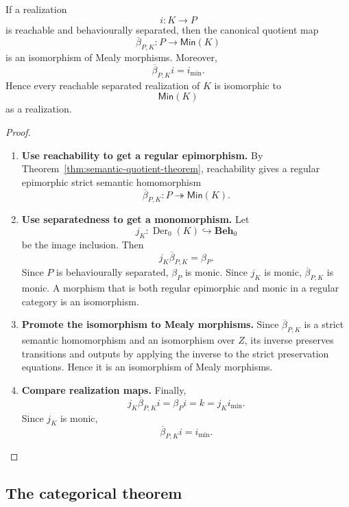 \begin{theorem}
\label{thm:minimal-realization}
    If a realization
    \[
        i:K\to P
    \]
    is reachable and behaviourally separated, then the canonical quotient map
    \[
        \overline{\beta}_{P,K}:P\to\mathsf{Min}(K)
    \]
    is an isomorphism of Mealy morphisms. Moreover,
    \[
        \overline{\beta}_{P,K}i=i_{\min}.
    \]
    Hence every reachable separated realization of \(K\) is isomorphic to
    \[
        \mathsf{Min}(K)
    \]
    as a realization.
\end{theorem}
\begin{proof}
    \leavevmode
    \begin{enumerate}
        \item \textbf{Use reachability to get a regular epimorphism.} By Theorem~\ref{thm:semantic-quotient-theorem}, reachability gives a regular epimorphic strict semantic homomorphism
        \[
            \overline{\beta}_{P,K}:P\twoheadrightarrow\mathsf{Min}(K).
        \]

        \item \textbf{Use separatedness to get a monomorphism.} Let
        \[
            j_K:\operatorname{Der}_0(K)\hookrightarrow\mathbf{Beh}_0
        \]
        be the image inclusion. Then
        \[
            j_K\overline{\beta}_{P,K}=\beta_P.
        \]
        Since \(P\) is behaviourally separated, \(\beta_P\) is monic. Since \(j_K\) is monic, \(\overline{\beta}_{P,K}\) is monic. A morphism that is both regular epimorphic and monic in a regular category is an isomorphism.

        \item \textbf{Promote the isomorphism to Mealy morphisms.} Since \(\overline{\beta}_{P,K}\) is a strict semantic homomorphism and an isomorphism over \(Z\), its inverse preserves transitions and outputs by applying the inverse to the strict preservation equations. Hence it is an isomorphism of Mealy morphisms.

        \item \textbf{Compare realization maps.} Finally,
        \[
            j_K\overline{\beta}_{P,K}i
            =
            \beta_P i
            =
            k
            =
            j_K i_{\min}.
        \]
        Since \(j_K\) is monic,
        \[
            \overline{\beta}_{P,K}i=i_{\min}.
        \]
    \end{enumerate}
\end{proof}

\subsection{The categorical theorem}
\label{subsec:categorical-myhill-nerode-theorem}

